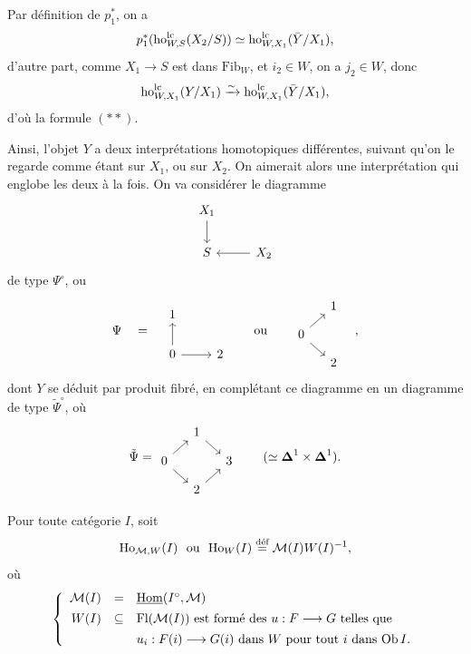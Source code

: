 Par définition de $p_1^*$, on a
\[
p_1^*(\mathrm{ho}^{\mathrm{lc}}_{W,S}(X_2/S)) \simeq \mathrm{ho}^{\mathrm{lc}}_{W,X_1}(\bar{Y}/X_1),
\]
d'autre part, comme $X_1 \longrightarrow S$ est dans $\mathrm{Fib}_W$, et $i_2 \in W$, on a $j_2 \in W$, donc
\[
\mathrm{ho}^{\mathrm{lc}}_{W,X_1}(Y/X_1) \xrightarrow{\sim} \mathrm{ho}^{\mathrm{lc}}_{W,X_1}(\bar{Y}/X_1),
\]
d'où la formule $(**)$.

Ainsi, l'objet $Y$ a deux interprétations homotopiques différentes, suivant qu'on le regarde comme étant sur $X_1$, ou sur $X_2$. On aimerait alors une interprétation qui englobe les deux à la fois. On va considérer le diagramme
\[
\begin{tikzcd}[ampersand replacement=\&]
X_1 \arrow[d] \& \\
S \& X_2 \arrow[l]
\end{tikzcd}
\]
de type $\Psi^\circ$, ou
\[
\Psi \quad = \quad
\begin{tikzcd}[ampersand replacement=\&]
1 \& \\
0 \arrow[u] \arrow[r] \& 2
\end{tikzcd}
\qquad \text{ou} \qquad
\begin{tikzcd}[ampersand replacement=\&, row sep=small, column sep=small]
 \& 1 \\
0 \arrow[ur] \arrow[dr] \& \\
 \& 2
\end{tikzcd}
\quad ,
\]
dont $Y$ se déduit par produit fibré, en complétant ce diagramme en un diagramme de type $\tilde{\Psi}^\circ$, où
\[
\tilde{\Psi} =
\begin{tikzcd}[ampersand replacement=\&, row sep=small, column sep=small]
 \& 1 \arrow[dr] \& \\
0 \arrow[ur] \arrow[dr] \& \& 3 \\
 \& 2 \arrow[ur] \&
\end{tikzcd}
\qquad (\simeq \boldsymbol{\Delta}^1 \times \boldsymbol{\Delta}^1).
\]

Pour toute catégorie $I$, soit
\[
\mathrm{Ho}_{\mathcal{M},W}(I) \text{ \ ou \ } \mathrm{Ho}_W(I) \overset{\text{déf}}{=} \mathcal{M}(I)W(I)^{-1},
\]
où
\[
\left\{
\begin{array}{rcl}
\mathcal{M}(I) & = & \underline{\mathrm{Hom}}(I^\circ, \mathcal{M}) \\[1ex]
W(I) & \subseteq & \mathrm{Fl}(\mathcal{M}(I)) \text{ est formé des } u : F \longrightarrow G \text{ telles que} \\[1ex]
 & & u_i : F(i) \longrightarrow G(i) \text{ dans } W \text{ pour tout } i \text{ dans } \mathrm{Ob}\, I.
\end{array}
\right.
\]


